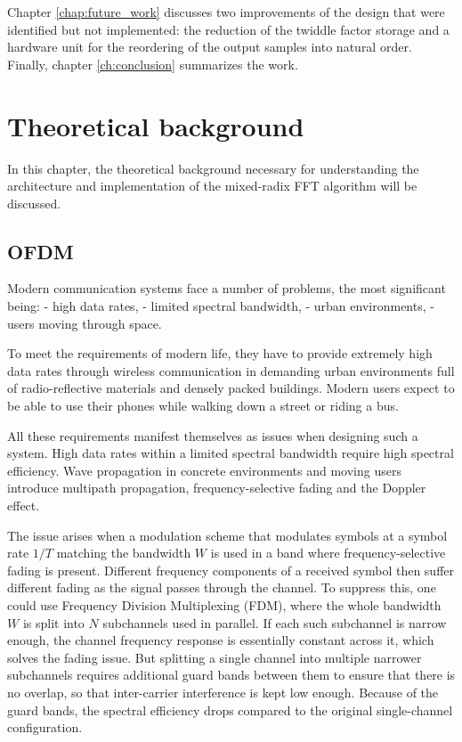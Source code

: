 \documentclass[a4paper,12pt, master]{etf}
\begin{document}
Chapter \ref{chap:future_work} discusses two improvements of the design that were identified but not implemented: the reduction of the twiddle factor storage and a hardware unit for the reordering of the output samples into natural order. Finally, chapter \ref{ch:conclusion} summarizes the work.


\chapter{Theoretical background}
\label{ch:theoretical_background}

In this chapter, the theoretical background necessary for understanding the architecture and implementation of the mixed-radix FFT algorithm will be discussed.

\section{OFDM}

Modern communication systems face a number of problems, the most significant being:
- high data rates,
- limited spectral bandwidth,
- urban environments,
- users moving through space.

To meet the requirements of modern life, they have to provide extremely high data rates through wireless communication in demanding urban environments full of radio-reflective materials and densely packed buildings. Modern users expect to be able to use their phones while walking down a street or riding a bus.

All these requirements manifest themselves as issues when designing such a system. High data rates within a limited spectral bandwidth require high spectral efficiency. Wave propagation in concrete environments and moving users introduce multipath propagation, frequency-selective fading and the Doppler effect.

The issue arises when a modulation scheme that modulates symbols at a symbol rate $1/T$ matching the bandwidth $W$ is used in a band where frequency-selective fading is present. Different frequency components of a received symbol then suffer different fading as the signal passes through the channel. To suppress this, one could use Frequency Division Multiplexing (FDM), where the whole bandwidth $W$ is split into $N$ subchannels used in parallel. If each such subchannel is narrow enough, the channel frequency response is essentially constant across it, which solves the fading issue. But splitting a single channel into multiple narrower subchannels requires additional guard bands between them to ensure that there is no overlap, so that inter-carrier interference is kept low enough. Because of the guard bands, the spectral efficiency drops compared to the original single-channel configuration.
\end{document}
